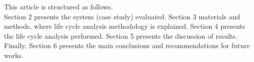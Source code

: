 \documentclass[]{elsarticle} %
\begin{document}
This article is structured as follows.\\
Section 2 presents the system (case study) evaluated.
Section 3 materials and methods, where life cycle analysis methodology is explained. Section 4 presents the life cycle analysis performed. Section 5 presents the discussion of results.
Finally, Section 6 presents the main conclusions and recommendations for future works.
\end{document}
